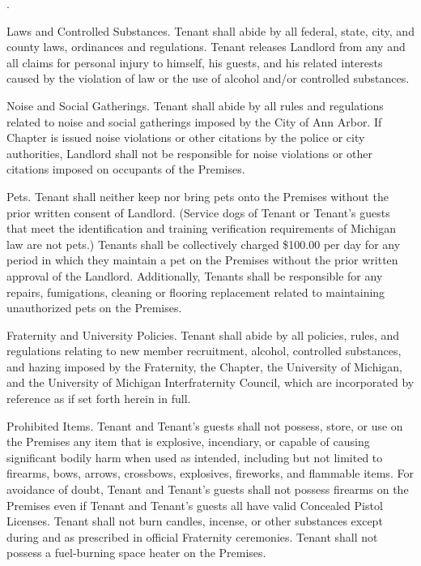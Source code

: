 \documentclass{article}
\begin{document}
\begin{compactList}{.}{}
  \item {\titleStyle Laws and Controlled Substances.} Tenant shall abide by all
  federal, state, city, and county laws, ordinances and regulations. Tenant
  releases Landlord from any and all claims for personal injury to himself, his
  guests, and his related interests caused by the violation of law or the use of
  alcohol and/or controlled substances.

  \item {\titleStyle Noise and Social Gatherings.} Tenant shall abide by all
  rules and regulations related to noise and social gatherings imposed by the
  City of Ann Arbor. If Chapter is issued noise violations or other citations by
  the police or city authorities, Landlord shall not be responsible for noise
  violations or other citations imposed on occupants of the Premises.

  \item {\titleStyle Pets.} Tenant shall neither keep nor bring pets onto the
  Premises without the prior written consent of Landlord. (Service dogs of
  Tenant or Tenant’s guests that meet the identification and training
  verification requirements of Michigan law are not pets.) Tenants shall be
  collectively charged \$100.00 per day for any period in which they maintain a
  pet on the Premises without the prior written approval of the Landlord.
  Additionally, Tenants shall be responsible for any repairs, fumigations,
  cleaning or flooring replacement related to maintaining unauthorized pets on
  the Premises.

  \item {\titleStyle Fraternity and University Policies.} Tenant shall abide by
  all policies, rules, and regulations relating to new member recruitment,
  alcohol, controlled substances, and hazing imposed by the Fraternity, the
  Chapter, the University of Michigan, and the University of Michigan
  Interfraternity Council, which are incorporated by reference as if set forth
  herein in full.

  \item {\titleStyle Prohibited Items.} Tenant and Tenant’s guests shall not
  possess, store, or use on the Premises any item that is explosive, incendiary,
  or capable of causing significant bodily harm when used as intended, including
  but not limited to firearms, bows, arrows, crossbows, explosives, fireworks,
  and flammable items. For avoidance of doubt, Tenant and Tenant’s guests shall
  not possess firearms on the Premises even if Tenant and Tenant’s guests all
  have valid Concealed Pistol Licenses. Tenant shall not burn candles, incense,
  or other substances except during and as prescribed in official Fraternity
  ceremonies. Tenant shall not possess a fuel-burning space heater on the
  Premises.


\end{compactList}
\end{document}
